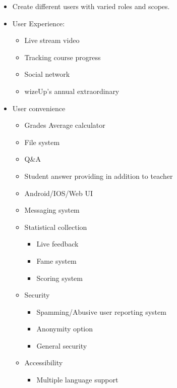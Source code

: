 \documentclass[12pt,a4paper]{article}
\begin{document}
    \begin{itemize}
        \item Create different users with varied roles and scopes.
        \item User Experience:
        \begin{itemize}
            \item Live stream video
            \item Tracking course progress
            \item Social network
            \item wizeUp's annual extraordinary
        \end{itemize}
        \item User convenience
        \begin{itemize}
            \item Grades Average calculator
            \item File system
            \item Q\&A
            \item Student answer providing in addition to teacher
            \item Android/IOS/Web UI
            \item Messaging system
            \item Statistical collection
            \begin{itemize}
                \item Live feedback
                \item Fame system
                \item Scoring system
            \end{itemize}
            \item Security
            \begin{itemize}
                \item Spamming/Abusive user reporting system
                \item Anonymity option
                \item General security
            \end{itemize}
            \item Accessibility
            \begin{itemize}
                \item Multiple language support
            \end{itemize}
        \end{itemize}
    \end{itemize}
    \newpage
\end{document}
